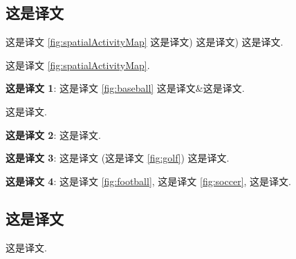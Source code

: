 \documentclass[sigconf]{acmart}
\begin{document}
	\subsection{这是译文}
	\label{sec:spatial_sports_mapping}  这是译文 \ref{fig:spatialActivityMap} 这是译文) 这是译文) 这是译文.
	
	这是译文 \ref{fig:spatialActivityMap}.
	
	\noindent \textbf{这是译文 1}: 这是译文 \ref{fig:baseball} 这是译文$\&$这是译文. 
	
	这是译文.
	
	
	\noindent \textbf{这是译文 2}: 这是译文.
	
	
	\noindent \textbf{这是译文 3}: 这是译文 (这是译文 \ref{fig:golf}) 这是译文.
	
	\noindent \textbf{这是译文 4}: 这是译文 \ref{fig:football}, 这是译文 \ref{fig:soccer}, 这是译文.
	
	\subsection{这是译文}
	\label{sec:spatio_temporal_parade_mapping}  这是译文.
	
\end{document}
